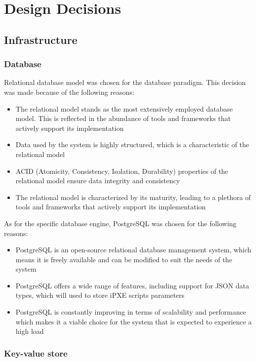 \documentclass[../main.tex]{subfiles}
\begin{document}
\section{Design Decisions}

\subsection{Infrastructure}

\subsubsection{Database}
Relational database model was chosen for the database paradigm. This decision was made because of the following reasons:

\begin{itemize}
  \item The relational model stands as the most extensively employed database model. This is reflected in the abundance of tools and frameworks that actively support its implementation
  \item Data used by the system is highly structured, which is a characteristic of the relational model
  \item ACID (Atomicity, Consistency, Isolation, Durability) properties of the relational model ensure data integrity and consistency
  \item The relational model is characterized by its maturity, leading to a plethora of tools and frameworks that actively support its implementation
\end{itemize}

As for the specific database engine, PostgreSQL\cite{postgresql} was chosen for the following reasons:

\begin{itemize}
  \item PostgreSQL is an open-source relational database management system, which means it is freely available and can be modified to suit the needs of the system
  \item PostgreSQL offers a wide range of features, including support for JSON data types, which will used to store iPXE scripts parameters
  \item PostgreSQL is constantly improving in terms of scalability and performance which makes it a viable choice for the system that is expected to experience a high load
\end{itemize}

\subsubsection{Key-value store}
\end{document}
